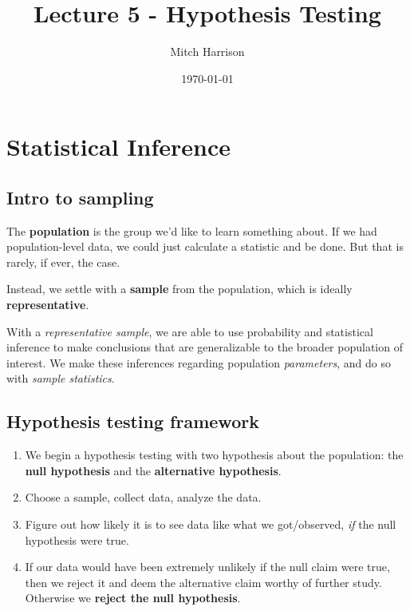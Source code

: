 \documentclass[titlepage, 12pt, leqno]{article}
\title{\Huge{Lecture 5 - Hypothesis Testing}}
\author{\large{Mitch Harrison}}
\date{\today}
\begin{document}
\setlength{\parskip}{1\baselineskip}
\setlength{\parindent}{15pt}
\maketitle
\tableofcontents
\newpage


\section{Statistical Inference}

\subsection{Intro to sampling}

\begin{definition}
    The \textbf{population} is the group we'd like to learn something about. If we had population-level data, we could just calculate a statistic and be done. But that is rarely, if ever, the case.

    Instead, we settle with a \textbf{sample} from the population, which is ideally \textbf{representative}. 
\end{definition}

With a \textit{representative sample}, we are able to use probability and statistical inference to make conclusions that are generalizable to the broader population of interest. We make these inferences regarding population \textit{parameters}, and do so with \textit{sample statistics}.

\subsection{Hypothesis testing framework}
\begin{enumerate}
    \item We begin a hypothesis testing with two hypothesis about the population: the \textbf{null hypothesis} and the \textbf{alternative hypothesis}.
    \item Choose a sample, collect data, analyze the data. 
    \item Figure out how likely it is to see data like what we got/observed, \textit{if} the null hypothesis were true.
    \item If our data would have been extremely unlikely if the null claim were true, then we reject it and deem the alternative claim worthy of further study. Otherwise we \textbf{reject the null hypothesis}.
\end{enumerate}
\end{document}
